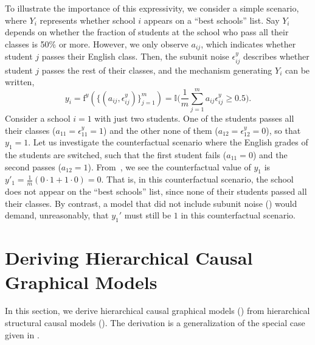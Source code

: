 \documentclass[12pt]{article}
\newcommand{\f}{\mathrm{f}}
\begin{document}
To illustrate the importance of this expressivity, we consider a simple scenario, where $Y_i$ represents whether school $i$ appears on a ``best schools'' list. Say $Y_i$ depends on whether the fraction of students at the school who pass all their classes is 50\% or more.
However, we only observe $a_{ij}$, which indicates whether student $j$ passes their English class. Then, the subunit noise $\epsilon_{ij}^y$ describes whether student $j$ passes the rest of their classes, and the mechanism generating $Y_i$ can be written,
\begin{equation} \label{eqn:counterfact_concrete}
	y_i = \f^y(\{(a_{ij}, \epsilon^y_{ij})\}_{j=1}^m) = \mathbb{I}\Big(\frac{1}{m}\sum_{j=1}^m a_{ij} \epsilon^y_{ij} \ge 0.5\Big).
\end{equation}
Consider a school $i = 1$ with just two students. One of the students passes all their classes ($a_{1 1} = \epsilon^y_{1 1} = 1$) and the other none of them ($a_{1 2} = \epsilon^y_{1 2} = 0$), so that $y_1 = 1$.
Let us investigate the counterfactual scenario where the English grades of the students are switched, such that the first student fails ($a_{1 1} = 0$) and the second passes ($a_{1 2} = 1$).
From~, we see the counterfactual value of $y_1$ is $y'_1 = \frac{1}{m} (0 \cdot 1 + 1 \cdot 0) = 0$.
That is, in this counterfactual scenario, the school does not appear on the ``best schools'' list, since none of their students passed all their classes.
By contrast, a model that did not include subunit noise () would demand, unreasonably, that $y_1'$ must still be $1$ in this counterfactual scenario. \section{Deriving Hierarchical Causal Graphical Models} \label{apx:hcgm}

In this section, we derive hierarchical causal graphical models () from hierarchical structural causal models ().
The derivation is a generalization of the special case given in . 
\end{document}
